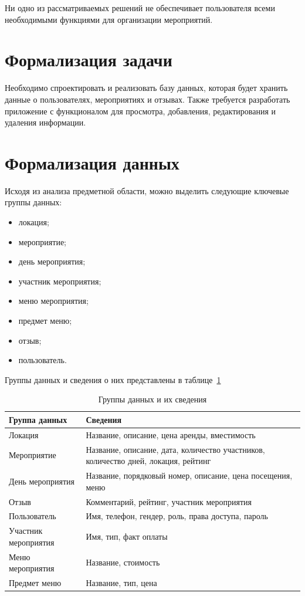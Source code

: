 Ни одно из рассматриваемых решений не обеспечивает пользователя всеми необходимыми функциями для организации мероприятий.

\section{Формализация задачи}

Необходимо спроектировать и реализовать базу данных, которая будет хранить данные о пользователях, мероприятиях и отзывах. Также требуется разработать приложение с функционалом для просмотра, добавления, редактирования и удаления информации.

\section{Формализация данных}

Исходя из анализа предметной области, можно выделить следующие ключевые группы данных:
\begin{itemize}[label=--]
	\item локация;
	\item мероприятие;
	\item день мероприятия;
	\item участник мероприятия;
	\item меню мероприятия;
	\item предмет меню;
	\item отзыв;
	\item пользователь.
\end{itemize}

Группы данных и сведения о них представлены в таблице~\ref{tbl:data-groups}

\begin{table}[h]
	\centering
	\caption{Группы данных и их сведения}
	\begin{tabularx}{\textwidth}{|X|X|}
		\hline
		\textbf{Группа данных} & \textbf{Сведения} \\
		\hline
		Локация & Название, описание, цена аренды, вместимость \\
		\hline
		Мероприятие & Название, описание, дата, количество участников, количество дней, локация, рейтинг \\
		\hline
		День мероприятия & Название, порядковый номер, описание, цена посещения, меню \\
		\hline
		Отзыв & Комментарий, рейтинг, участник мероприятия \\
		\hline
		Пользователь & Имя, телефон, гендер, роль, права доступа, пароль \\
		\hline
		Участник мероприятия & Имя, тип, факт оплаты \\
		\hline
		Меню мероприятия & Название, стоимость \\
		\hline
		Предмет меню & Название, тип, цена \\
		\hline
	\end{tabularx}
	\label{tbl:data-groups}
\end{table}

